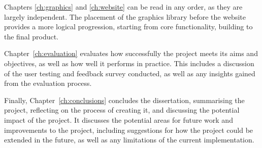 \documentclass[../main.tex]{subfiles}
\begin{document}
        Chapters \ref{ch:graphics} and \ref{ch:website} can be read in any order, as
            they are largely independent.
        The placement of the graphics library before the website provides a more
            logical progression, starting from core functionality, building to the final
            product.

        Chapter~\ref{ch:evaluation} evaluates how successfully the project meets its
            aims and objectives, as well as how well it performs in practice.
        This includes a discussion of the user testing and feedback survey conducted,
            as well as any insights gained from the evaluation process.

        Finally, Chapter~\ref{ch:conclusions} concludes the dissertation, summarising
            the project, reflecting on the process of creating it, and discussing the
            potential impact of the project.
        It discusses the potential areas for future work and improvements to the
            project, including suggestions for how the project could be extended in the
            future, as well as any limitations of the current implementation.
\end{document}
